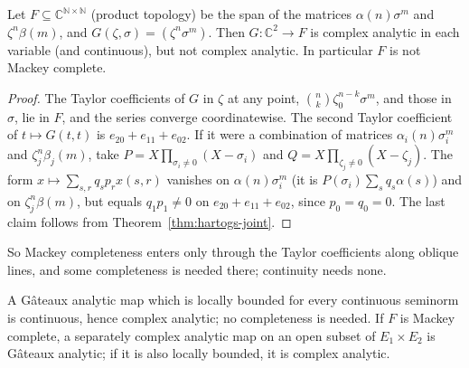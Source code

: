 \begin{example}
  \label{ex:hartogs-incomplete}
  \leanok
  Let $F \subseteq \mathbb{C}^{\mathbb{N} \times \mathbb{N}}$ (product topology) be the span of the
  matrices $\alpha(n) \sigma^m$ and $\zeta^n \beta(m)$, and $G(\zeta, \sigma) = (\zeta^n \sigma^m)$.
  Then $G \colon \mathbb{C}^2 \to F$ is complex analytic in each variable (and continuous), but not
  complex analytic. In particular $F$ is not Mackey complete.
\end{example}

\begin{proof}
  \leanok
  The Taylor coefficients of $G$ in $\zeta$ at any point, $\binom{n}{k} \zeta_0^{n-k} \sigma^m$, and
  those in $\sigma$, lie in $F$, and the series converge coordinatewise. The second Taylor
  coefficient of $t \mapsto G(t, t)$ is $e_{20} + e_{11} + e_{02}$. If it were a combination of
  matrices $\alpha_i(n) \sigma_i^m$ and $\zeta_j^n \beta_j(m)$, take
  $P = X \prod_{\sigma_i \ne 0} (X - \sigma_i)$ and $Q = X \prod_{\zeta_j \ne 0} (X - \zeta_j)$. The
  form $x \mapsto \sum_{s, r} q_s p_r x(s, r)$ vanishes on $\alpha(n)\sigma_i^m$ (it is
  $P(\sigma_i) \sum_s q_s \alpha(s)$) and on $\zeta_j^n \beta(m)$, but equals $q_1 p_1 \ne 0$ on
  $e_{20} + e_{11} + e_{02}$, since $p_0 = q_0 = 0$. The last claim follows from
  Theorem~\ref{thm:hartogs-joint}.
\end{proof}

So Mackey completeness enters only through the Taylor coefficients along oblique lines, and some
completeness is needed there; continuity needs none.

\begin{theorem}
  \label{thm:separate-products}
  \leanok
  A Gâteaux analytic map which is locally bounded for every continuous seminorm is continuous,
  hence complex analytic; no completeness is needed. If $F$ is Mackey complete, a separately
  complex analytic map on an open subset of $E_1 \times E_2$ is Gâteaux analytic; if it is also
  locally bounded, it is complex analytic.
\end{theorem}

